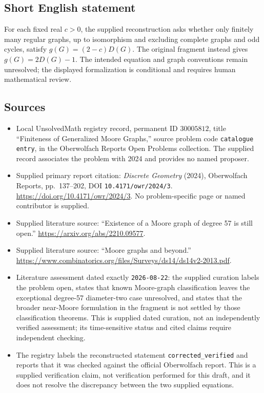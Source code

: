 \documentclass[11pt]{article}
\begin{document}
\subsection{Short English statement}
For each fixed real \(c>0\), the supplied reconstruction asks whether only finitely many regular graphs, up to isomorphism and excluding complete graphs and odd cycles, satisfy \(g(G)=(2-c)D(G)\). The original fragment instead gives \(g(G)=2D(G)-1\). The intended equation and graph conventions remain unresolved; the displayed formalization is conditional and requires human mathematical review.
\subsection{Sources}
\begin{itemize}
\item Local UnsolvedMath registry record, permanent ID \(30005812\), title ``Finiteness of Generalized Moore Graphs,'' source problem code \texttt{catalogue entry}, in the Oberwolfach Reports Open Problems collection. The supplied record associates the problem with 2024 and provides no named proposer.
\item Supplied primary report citation: \emph{Discrete Geometry} (2024), Oberwolfach Reports, pp.\ 137--202, DOI \texttt{10.4171/owr/2024/3}. \url{https://doi.org/10.4171/owr/2024/3}. No problem-specific page or named contributor is supplied.
\item Supplied literature source: ``Existence of a Moore graph of degree 57 is still open.'' \url{https://arxiv.org/abs/2210.09577}.
\item Supplied literature source: ``Moore graphs and beyond.'' \url{https://www.combinatorics.org/files/Surveys/ds14/ds14v2-2013.pdf}.
\item Literature assessment dated exactly \texttt{2026-08-22}: the supplied curation labels the problem open, states that known Moore-graph classification leaves the exceptional degree-57 diameter-two case unresolved, and states that the broader near-Moore formulation in the fragment is not settled by those classification theorems. This is supplied dated curation, not an independently verified assessment; its time-sensitive status and cited claims require independent checking.
\item The registry labels the reconstructed statement \texttt{corrected\_verified} and reports that it was checked against the official Oberwolfach report. This is a supplied verification claim, not verification performed for this draft, and it does not resolve the discrepancy between the two supplied equations.
\end{itemize}
\end{document}
